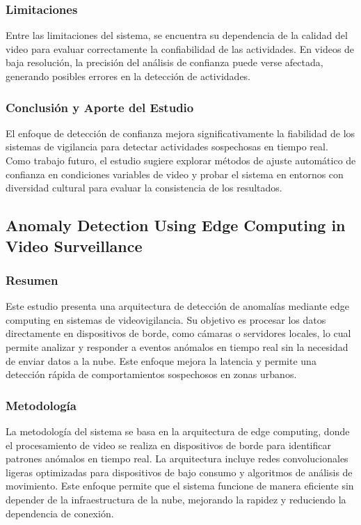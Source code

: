 \subsubsection{Limitaciones}
Entre las limitaciones del sistema, se encuentra su dependencia de la calidad del video para evaluar correctamente la confiabilidad de las actividades. En videos de baja resolución, la precisión del análisis de confianza puede verse afectada, generando posibles errores en la detección de actividades.

\subsubsection{Conclusión y Aporte del Estudio}
El enfoque de detección de confianza mejora significativamente la fiabilidad de los sistemas de vigilancia para detectar actividades sospechosas en tiempo real. Como trabajo futuro, el estudio sugiere explorar métodos de ajuste automático de confianza en condiciones variables de video y probar el sistema en entornos con diversidad cultural para evaluar la consistencia de los resultados.





\subsection{Anomaly Detection Using Edge Computing in Video Surveillance}

\subsubsection{Resumen}
Este estudio presenta una arquitectura de detección de anomalías mediante edge computing en sistemas de videovigilancia. Su objetivo es procesar los datos directamente en dispositivos de borde, como cámaras o servidores locales, lo cual permite analizar y responder a eventos anómalos en tiempo real sin la necesidad de enviar datos a la nube. Este enfoque mejora la latencia y permite una detección rápida de comportamientos sospechosos en zonas urbanos.

\subsubsection{Metodología}
La metodología del sistema se basa en la arquitectura de edge computing, donde el procesamiento de video se realiza en dispositivos de borde para identificar patrones anómalos en tiempo real. La arquitectura incluye redes convolucionales ligeras optimizadas para dispositivos de bajo consumo y algoritmos de análisis de movimiento. Este enfoque permite que el sistema funcione de manera eficiente sin depender de la infraestructura de la nube, mejorando la rapidez y reduciendo la dependencia de conexión.


